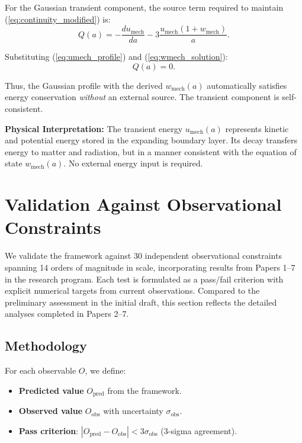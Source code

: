\documentclass[11pt,a4paper]{article}
\newcommand{\umech}{\ensuremath{u_{\mathrm{mech}}}}
\newcommand{\wmech}{\ensuremath{w_{\mathrm{mech}}}}
\theoremstyle{definition}
\theoremstyle{remark}
\begin{document}
For the Gaussian transient component, the source term required to maintain (\ref{eq:continuity_modified}) is:
\begin{equation}
\label{eq:source_term}
Q(a) = -\frac{d\umech}{da} - 3\frac{\umech(1 + \wmech)}{a}.
\end{equation}

Substituting (\ref{eq:umech_profile}) and (\ref{eq:wmech_solution}):
\begin{equation}
Q(a) = 0.
\end{equation}

Thus, the Gaussian profile with the derived $\wmech(a)$ automatically satisfies energy conservation \emph{without} an external source. The transient component is self-consistent.

\textbf{Physical Interpretation:} The transient energy $\umech(a)$ represents kinetic and potential energy stored in the expanding boundary layer. Its decay transfers energy to matter and radiation, but in a manner consistent with the equation of state $\wmech(a)$. No external energy input is required.

\section{Validation Against Observational Constraints}
\label{sec:validation}

We validate the framework against 30 independent observational constraints spanning 14 orders of magnitude in scale, incorporating results from Papers 1--7 in the research program. Each test is formulated as a pass/fail criterion with explicit numerical targets from current observations. Compared to the preliminary assessment in the initial draft, this section reflects the detailed analyses completed in Papers 2--7.

\subsection{Methodology}
\label{sec:validation_method}

For each observable $O$, we define:
\begin{itemize}[leftmargin=*, itemsep=0.2em]
\item \textbf{Predicted value} $O_{\mathrm{pred}}$ from the framework.
\item \textbf{Observed value} $O_{\mathrm{obs}}$ with uncertainty $\sigma_{\mathrm{obs}}$.
\item \textbf{Pass criterion}: $|O_{\mathrm{pred}} - O_{\mathrm{obs}}| < 3\sigma_{\mathrm{obs}}$ (3-sigma agreement).
\end{itemize}
\end{document}
